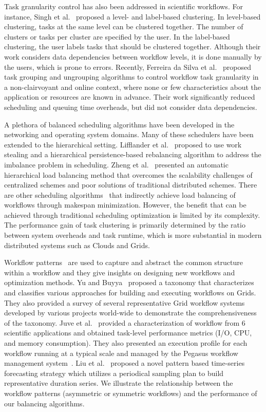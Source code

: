 Task granularity control has also been addressed in scientific workflows. For instance, Singh et al.~\cite{Singh:2008:WTC:1341811.1341822} proposed a level- and label-based clustering. In level-based clustering, tasks at the same level can be clustered together. The number of clusters or tasks per cluster are specified by the user. In the label-based clustering, the user labels tasks that should be clustered together. Although their work considers data dependencies between workflow levels, it is done manually by the users, which is prone to errors. Recently, Ferreira da Silva et al.~\cite{Ferreira-granularity-2013,FerreiradaSilva-CCPE-2014} proposed task grouping and ungrouping algorithms to control workflow task granularity in a non-clairvoyant and online context, where none or few characteristics about the application or resources are known in advance. Their work significantly reduced scheduling and queuing time overheads, but did not consider data dependencies.

A plethora of balanced scheduling algorithms have been developed in the networking and operating system domains. Many of these schedulers have been extended to the hierarchical setting. Lifflander et al.~\cite{Lifflander} proposed to use work stealing and a hierarchical persistence-based rebalancing algorithm to address the imbalance problem in scheduling. Zheng et al.~\cite{Zheng} presented an automatic hierarchical load balancing method that overcomes the scalability challenges of centralized schemes and poor solutions of traditional distributed schemes. There are other scheduling algorithms~\cite{rizos2008} that indirectly achieve load balancing of workflows through makespan minimization. However, the benefit that can be achieved through traditional scheduling optimization is limited by its complexity. The performance gain of task clustering is primarily determined by the ratio between system overheads and task runtime, which is more substantial in modern distributed systems such as Clouds and Grids. 

Workflow patterns~\cite{Yu2005, Juve2013, Liu2008} are used to capture and abstract the common structure within a workflow and they give insights on designing new workflows and optimization methods. Yu and Buyya~\cite{Yu2005} proposed a taxonomy that characterizes and classifies various approaches for building and executing workflows on Grids. They also provided a survey of several representative Grid workflow systems developed by various projects world-wide to demonstrate the comprehensiveness of the taxonomy. Juve et al.~\cite{Juve2013} provided a characterization of workflow from 6 scientific applications and obtained task-level performance metrics (I/O, CPU, and memory consumption). They also presented an execution profile for each workflow running at a typical scale and managed by the Pegasus workflow management system~\cite{Deelman2004}. Liu et al.~\cite{Liu2008} proposed a novel pattern based time-series forecasting strategy which utilizes a periodical sampling plan to build representative duration series. We illustrate the relationship between the workflow patterns (asymmetric or symmetric workflows) and the performance of our balancing algorithms. 

